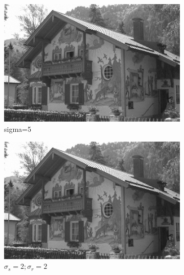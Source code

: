\documentclass[12pt]{article}
\begin{document}
\begin{figure}[h]
    \centering
    \begin{subfigure}[b]{0.24\textwidth}
        \centering
        \includegraphics[width=\textwidth]{../images/noisy_kodak24.png}
        \caption{sigma=5}
        \label{Noisy }
    \end{subfigure}
    \begin{subfigure}[b]{0.24\textwidth}
        \centering
        \includegraphics[width=\textwidth]{../images/filtered_kodak24_bilateral_sigma_s_2_sigma_r_2.png}
        \caption{$\sigma_s=2;\sigma_r=2$}
        \label{fig:subfig2}
    \end{subfigure}
    \begin{subfigure}[b]{0.24\textwidth}
        \centering

\end{subfigure}
\end{figure}
\end{document}
